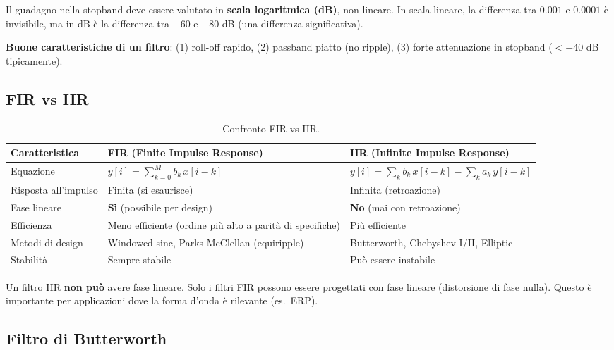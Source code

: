 \begin{attenzione}[]
Il guadagno nella stopband deve essere valutato in \textbf{scala logaritmica (dB)}, non lineare. In scala lineare, la differenza tra $0.001$ e $0.0001$ è invisibile, ma in dB è la differenza tra $-60$ e $-80$ dB (una differenza significativa).
\end{attenzione}

\textbf{Buone caratteristiche di un filtro}: (1) roll-off rapido, (2) passband piatto (no ripple), (3) forte attenuazione in stopband ($< -40$ dB tipicamente).

\subsection{FIR vs IIR}

\begin{table}[h!]
\centering
\begin{tabular}{p{3.5cm}p{5.5cm}p{5cm}}
\toprule
\textbf{Caratteristica} & \textbf{FIR (Finite Impulse Response)} & \textbf{IIR (Infinite Impulse Response)} \\
\midrule
Equazione & $y[i] = \sum_{k=0}^{M} b_k\, x[i-k]$ & $y[i] = \sum_{k} b_k\, x[i-k] - \sum_{k} a_k\, y[i-k]$ \\[4pt]
Risposta all'impulso & Finita (si esaurisce) & Infinita (retroazione) \\[4pt]
Fase lineare & \textbf{Sì} (possibile per design) & \textbf{No} (mai con retroazione) \\[4pt]
Efficienza & Meno efficiente (ordine più alto a parità di specifiche) & Più efficiente \\[4pt]
Metodi di design & Windowed sinc, Parks-McClellan (equiripple) & Butterworth, Chebyshev I/II, Elliptic \\[4pt]
Stabilità & Sempre stabile & Può essere instabile \\
\bottomrule
\end{tabular}
\caption{Confronto FIR vs IIR.}
\end{table}

\begin{attenzione}[]
Un filtro IIR \textbf{non può} avere fase lineare. Solo i filtri FIR possono essere progettati con fase lineare (distorsione di fase nulla). Questo è importante per applicazioni dove la forma d'onda è rilevante (es.\ ERP).
\end{attenzione}

\subsection{Filtro di Butterworth}

